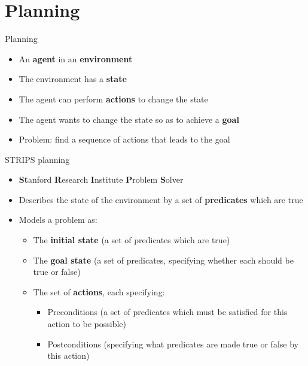 \part{Planning}
\frame{\partpage}

\begin{frame}{Planning}
	\begin{itemize}
		\pause\item An \textbf{agent} in an \textbf{environment}
		\pause\item The environment has a \textbf{state}
		\pause\item The agent can perform \textbf{actions} to change the state
		\pause\item The agent wants to change the state so as to achieve a \textbf{goal}
		\pause\item Problem: find a sequence of actions that leads to the goal
	\end{itemize}
\end{frame}

\begin{frame}{STRIPS planning}
	\begin{itemize}
		\pause\item \textbf{St}anford \textbf{R}esearch \textbf{I}nstitute \textbf{P}roblem \textbf{S}olver
		\pause\item Describes the state of the environment by a set of \textbf{predicates} which are true
		\pause\item Models a problem as:
			\begin{itemize}
				\pause\item The \textbf{initial state} (a set of predicates which are true)
				\pause\item The \textbf{goal state} (a set of predicates, specifying whether each should be true or false)
				\pause\item The set of \textbf{actions}, each specifying:
					\begin{itemize}
						\pause\item Preconditions (a set of predicates which must be satisfied for this action to be possible) 
						\pause\item Postconditions (specifying what predicates are made true or false by this action)
					\end{itemize}
			\end{itemize}
	\end{itemize}
\end{frame}

